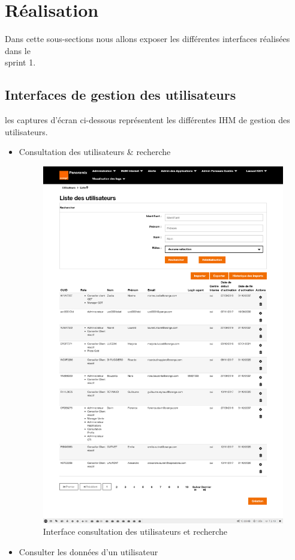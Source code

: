 \section[Réalisation]{Réalisation}
Dans cette sous-sections nous allons exposer les différentes interfaces réalisées dans le \\sprint 1. 
\subsection[Interfaces de gestion des utilisateurs]{Interfaces de gestion des utilisateurs}
les captures d'écran ci-dessous représentent les différentes IHM de gestion des utilisateurs.
\begin{itemize}
	\item Consultation des utilisateurs \& recherche
	\begin{figure}[H]
		\centering
		\includegraphics[width=0.7\linewidth]{img/screenshots/users/consultation}
		\caption[Interface consultation des utilisateurs et recherche]{Interface consultation des utilisateurs et recherche}
		\label{fig:consultation-user}
	\end{figure}
	\newpage
	\item Consulter les données d'un utilisateur
	\begin{figure}[H]
		\centering

\end{figure}
\end{itemize}
